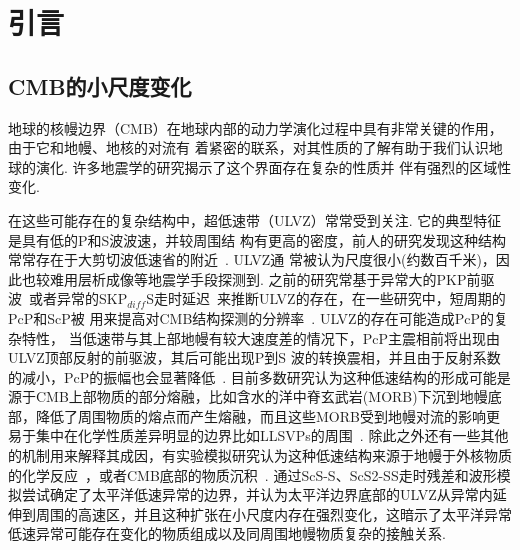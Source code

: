 \chapter{引言}

\section{CMB的小尺度变化}

地球的核幔边界（CMB）在地球内部的动力学演化过程中具有非常关键的作用，由于它和地幔、地核的对流有
着紧密的联系，对其性质的了解有助于我们认识地球的演化. 许多地震学的研究揭示了这个界面存在复杂的性质并
伴有强烈的区域性变化. 

在这些可能存在的复杂结构中，超低速带（ULVZ）常常受到关注. 它的典型特征是具有低的P和S波波速，并较周围结
构有更高的密度，前人的研究发现这种结构常常存在于大剪切波低速省的附近~\citep{Garnero2008}. ULVZ通
常被认为尺度很小(约数百千米)，因此也较难用层析成像等地震学手段探测到. 之前的研究常基于异常大的PKP前驱波~\citep{vidale1998evidence,Thomas2009}或者异常的SKP${}_{diff}$S走时延迟~\citep{Thorne2004a,Garnero1995}来推断ULVZ的存在，在一些研究中，短周期的PcP和ScP被
用来提高对CMB结构探测的分辨率~\citep{Castle2000,Rost2004a}. ULVZ的存在可能造成PcP的复杂特性，
当低速带与其上部地幔有较大速度差的情况下，PcP主震相前将出现由ULVZ顶部反射的前驱波，其后可能出现P到S
波的转换震相，并且由于反射系数的减小，PcP的振幅也会显著降低~\citep{Gassner2015}. 目前多数研究认为这种低速结构的形成可能是源于CMB上部物质的部分熔融，比如含水的洋中脊玄武岩(MORB)下沉到地幔底部，降低了周围物质的熔点而产生熔融，而且这些MORB受到地幔对流的影响更易于集中在化学性质差异明显的边界比如LLSVPs的周围~\citep{Xu2009a}. 除此之外还有一些其他的机制用来解释其成因，有实验模拟研究认为这种低速结构来源于地幔于外核物质的化学反应~\citep{Hirose2005a}，或者CMB底部的物质沉积~\citep{Buffett2000a}. \citet{He2006a,He2012a}通过ScS-S、ScS2-SS走时残差和波形模拟尝试确定了太平洋低速异常的边界，并认为太平洋边界底部的ULVZ从异常内延伸到周围的高速区，并且这种扩张在小尺度内存在强烈变化，这暗示了太平洋异常低速异常可能存在变化的物质组成以及同周围地幔物质复杂的接触关系. 

